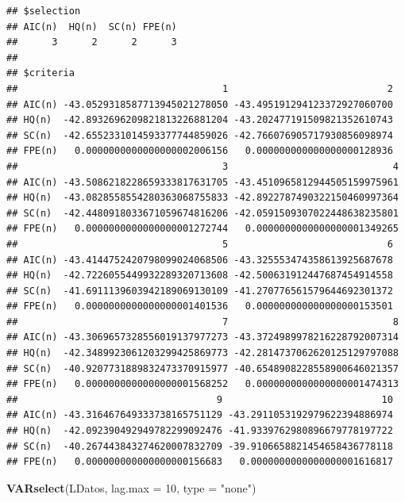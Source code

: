 \documentclass[
]{book}
\newenvironment{Shaded}{\begin{snugshade}}{\end{snugshade}}
\newcommand{\AttributeTok}[1]{\textcolor[rgb]{0.13,0.29,0.53}{#1}}
\newcommand{\DecValTok}[1]{\textcolor[rgb]{0.00,0.00,0.81}{#1}}
\newcommand{\FunctionTok}[1]{\textcolor[rgb]{0.13,0.29,0.53}{\textbf{#1}}}
\newcommand{\NormalTok}[1]{#1}
\newcommand{\StringTok}[1]{\textcolor[rgb]{0.31,0.60,0.02}{#1}}
\begin{document}
\begin{verbatim}
## $selection
## AIC(n)  HQ(n)  SC(n) FPE(n) 
##      3      2      2      3 
## 
## $criteria
##                                    1                            2
## AIC(n) -43.0529318587713945021278050 -43.495191294123372927060700
## HQ(n)  -42.8932696209821813226881204 -43.202477191509821352610743
## SC(n)  -42.6552331014593377744859026 -42.766076905717930856098974
## FPE(n)   0.0000000000000000002006156   0.000000000000000000128936
##                                    3                             4
## AIC(n) -43.5086218228659333817631705 -43.4510965812944505159975961
## HQ(n)  -43.0828558554280363068755833 -42.8922787490322150460997364
## SC(n)  -42.4480918033671059674816206 -42.0591509307022448638235801
## FPE(n)   0.0000000000000000001272744   0.0000000000000000001349265
##                                    5                            6
## AIC(n) -43.4144752420798099024068506 -43.325553474358613925687678
## HQ(n)  -42.7226055449932289320713608 -42.500631912447687454914558
## SC(n)  -41.6911139603942189069130109 -41.270776561579644692301372
## FPE(n)   0.0000000000000000001401536   0.000000000000000000153501
##                                    7                             8
## AIC(n) -43.3069657328556019137977273 -43.3724989978216228792007314
## HQ(n)  -42.3489923061203299425869773 -42.2814737062620125129797088
## SC(n)  -40.9207731889832473370915977 -40.6548908228558900646021357
## FPE(n)   0.0000000000000000001568252   0.0000000000000000001474313
##                                   9                            10
## AIC(n) -43.316467649333738165751129 -43.2911053192979622394886974
## HQ(n)  -42.092390492949782299092476 -41.9339762980896679778197722
## SC(n)  -40.267443843274620007832709 -39.9106658821454658436778118
## FPE(n)   0.000000000000000000156683   0.0000000000000000001616817
\end{verbatim}

\begin{Shaded}
\begin{Highlighting}[]
\FunctionTok{VARselect}\NormalTok{(LDatos, }\AttributeTok{lag.max =} \DecValTok{10}\NormalTok{, }\AttributeTok{type =} \StringTok{"none"}\NormalTok{)}
\end{Highlighting}
\end{Shaded}
\end{document}

